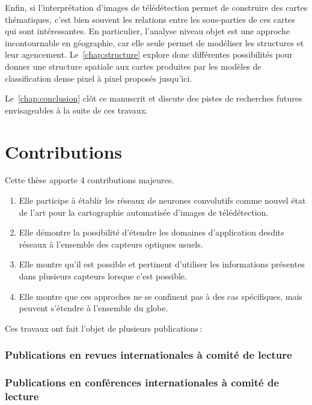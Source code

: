 Enfin, si l'interprétation d'images de télédétection permet de construire des cartes thématiques, c'est bien souvent les relations entre les sous-parties de ces cartes qui sont intéressantes. En particulier, l'analyse niveau objet est une approche incontournable en géographie, car elle seule permet de modéliser les structures et leur agencement. Le~\cref{chap:structure} explore donc différentes possibilités pour donner une structure spatiale aux cartes produites par les modèles de classification dense pixel à pixel proposés jusqu'ici.

Le~\cref{chap:conclusion} clôt ce manuscrit et discute des pistes de recherches futures envisageables à la suite de ces travaux.

\section{Contributions}

Cette thèse apporte 4 contributions majeures.
\begin{enumerate}
  \item Elle participe à établir les réseaux de neurones convolutifs comme nouvel état de l'art pour la cartographie automatisée d'images de télédétection.
  \item Elle démontre la possibilité d'étendre les domaines d'application desdits réseaux à l'ensemble des capteurs optiques usuels.
  \item Elle montre qu'il est possible et pertinent d'utiliser les informations présentes dans plusieurs capteurs lorsque c'est possible.
  \item Elle montre que ces approches ne se confinent pas à des cas spécifiques, mais peuvent s'étendre à l'ensemble du globe.
\end{enumerate}

Ces travaux ont fait l'objet de plusieurs publications\,:

\subsubsection*{Publications en revues internationales à comité de lecture}



\subsubsection*{Publications en conférences internationales à comité de lecture}






\medskip



%
%
\printbibliography
